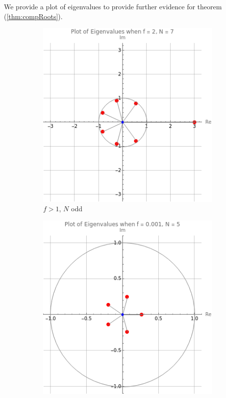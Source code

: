 \documentclass{article}
\numberwithin{equation}{section}
\begin{document}
We provide a plot of eigenvalues to provide further evidence for 
theorem (\ref{thm:compRoots}). 
\begin{figure}[htp]
    \centering
    \begin{subfigure}[b]{0.45\textwidth}
        \includegraphics[width=\textwidth]{f2N7.png}
        \caption{$f > 1$, $N$ odd}
        \label{fig:fig1}
    \end{subfigure}
    \hfill
    \begin{subfigure}[b]{0.45\textwidth}
        \includegraphics[width=\textwidth]{fsmN5.png}

\end{subfigure}
\end{figure}
\end{document}
